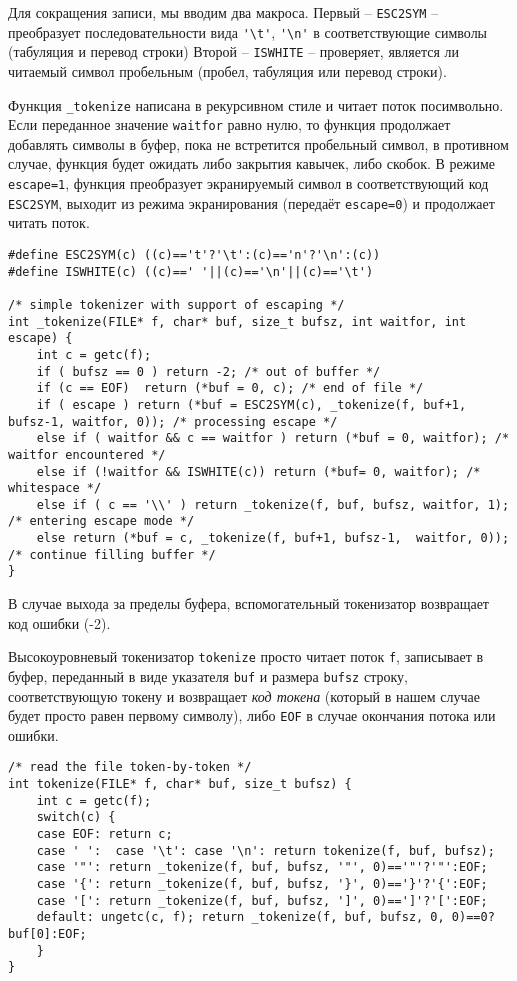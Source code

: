 \documentclass[10pt]{report}
\begin{document}
Для сокращения записи, мы вводим два макроса.
Первый -- {\tt ESC2SYM} -- преобразует последовательности вида \verb|'\t'|, \verb|'\n'| в соответствующие символы (табуляция и перевод строки)
Второй -- {\tt ISWHITE} -- проверяет, является ли читаемый символ пробельным (пробел, табуляция или перевод строки).

Функция {\tt \_tokenize} написана в рекурсивном стиле и читает поток посимвольно.
Если переданное  значение {\tt waitfor} равно нулю, то функция продолжает добавлять символы в буфер, пока не встретится пробельный символ, в противном случае, функция будет ожидать либо закрытия кавычек, либо скобок.
В режиме {\tt escape=1},  функция преобразует экранируемый символ в соответствующий код {\tt ESC2SYM}, выходит из режима экранирования (передаёт {\tt escape=0}) и продолжает читать поток.
 
\begin{lstlisting}[firstnumber=7, caption=uforth.c -- вспомогательный токенизатор]
#define ESC2SYM(c) ((c)=='t'?'\t':(c)=='n'?'\n':(c))
#define ISWHITE(c) ((c)==' '||(c)=='\n'||(c)=='\t')

/* simple tokenizer with support of escaping */
int _tokenize(FILE* f, char* buf, size_t bufsz, int waitfor, int escape) {
	int c = getc(f);
	if ( bufsz == 0 ) return -2; /* out of buffer */
	if (c == EOF)  return (*buf = 0, c); /* end of file */
	if ( escape ) return (*buf = ESC2SYM(c), _tokenize(f, buf+1, bufsz-1, waitfor, 0)); /* processing escape */
	else if ( waitfor && c == waitfor ) return (*buf = 0, waitfor); /* waitfor encountered */
	else if (!waitfor && ISWHITE(c)) return (*buf= 0, waitfor); /* whitespace */
	else if ( c == '\\' ) return _tokenize(f, buf, bufsz, waitfor, 1); /* entering escape mode */
	else return (*buf = c, _tokenize(f, buf+1, bufsz-1,  waitfor, 0)); /* continue filling buffer */
}
\end{lstlisting}
В случае выхода за пределы буфера, вспомогательный токенизатор возвращает код ошибки (-2).

Высокоуровневый токенизатор {\tt tokenize} просто читает поток {\tt f}, записывает в буфер, переданный в виде указателя {\tt buf} и размера {\tt bufsz} строку, соответствующую токену и возвращает {\em код токена} (который в нашем случае будет просто равен первому символу), либо {\tt EOF} в случае окончания потока или ошибки.

\begin{lstlisting}[firstnumber=21, caption=uforth.c -- высокоуровневый токенизатор]
/* read the file token-by-token */
int tokenize(FILE* f, char* buf, size_t bufsz) {
	int c = getc(f);
	switch(c) {
	case EOF: return c;
	case ' ':  case '\t': case '\n': return tokenize(f, buf, bufsz);
	case '"': return _tokenize(f, buf, bufsz, '"', 0)=='"'?'"':EOF;
	case '{': return _tokenize(f, buf, bufsz, '}', 0)=='}'?'{':EOF;
	case '[': return _tokenize(f, buf, bufsz, ']', 0)==']'?'[':EOF;
	default: ungetc(c, f); return _tokenize(f, buf, bufsz, 0, 0)==0?buf[0]:EOF;
	}
}
\end{lstlisting}
\end{document}
